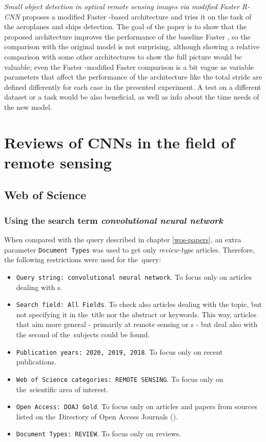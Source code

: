 \textit{Small object detection in optical remote sensing images via modified Faster R-CNN} proposes a modified Faster -based architecture and tries it on the task of the aeroplanes and ships detection. The goal of the paper is to show that the proposed architecture improves the performance of the baseline Faster , so the comparison with the original model is not surprising, although showing a relative comparison with some other architectures to show the full picture would be valuable; even the Faster -modified Faster  comparison is a bit vague as variable parameters that affect the performance of the architecture like the total stride are defined differently for each case in the presented experiment. A test on a different dataset or a task would be also beneficial, as well as info about the time needs of the new model.

\section{Reviews of CNNs in the field of remote sensing}
\label{top-reviews}

\subsection{Web of Science}
\label{wos-reviews}

\subsubsection{Using the search term \textit{convolutional neural network}}
\label{wos-reviews-full-length}

When compared with the query described in chapter \ref{wos-papers}, an extra parameter \verb|Document Types| was used to get only \textit{review-type} articles. Therefore, the following restrictions were used for the~query:

\begin{itemize}
	\item \verb|Query string: convolutional neural network|. To focus only on articles dealing with s.
	\item \verb|Search field: All Fields|. To check also articles dealing with the topic, but not specifying it in the~title nor the abstract or keywords. This way, articles that aim more general - primarily at remote sensing or s - but deal also with the second of the~subjects could be found.
	\item \verb|Publication years: 2020, 2019, 2018|. To focus only on recent publications.
	\item \verb|Web of Science categories: REMOTE SENSING|. To focus only on the~scien\-ti\-fic area of interest.
	\item \verb|Open Access: DOAJ Gold|. To focus only on articles and papers from sources listed on the~Di\-rectory of Open Access Journals ().
	\item \verb|Document Types: REVIEW|. To focus only on reviews.
\end{itemize}

